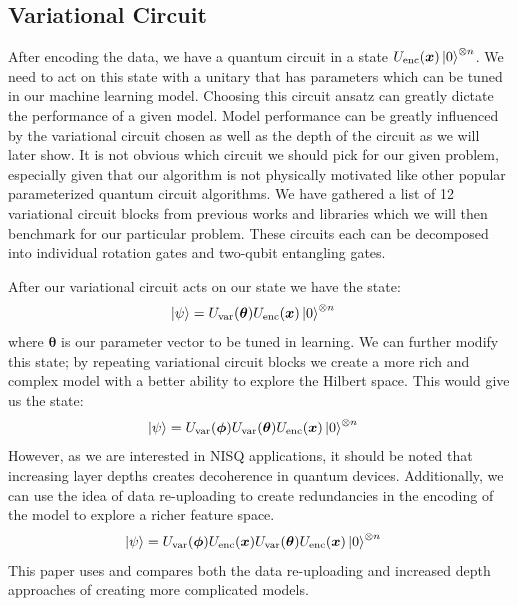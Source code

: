 \documentclass[journal=jacsat,manuscript=article]{achemso}
\begin{document}
\subsection{Variational Circuit}
After encoding the data, we have a quantum circuit in a state $U_{\text{enc}}(\bm x)\ket{0}^{\otimes n}$. We need to act on this state with a unitary that has parameters which can be tuned in our machine learning model. Choosing this circuit ansatz can greatly dictate the performance of a given model. Model performance can be greatly influenced by the variational circuit chosen as well as the depth of the circuit as we will later show. It is not obvious which circuit we should pick for our given problem, especially given that our algorithm is not physically motivated like other popular parameterized quantum circuit algorithms. We have gathered a list of 12 variational circuit blocks from previous works and libraries which we will then benchmark for our particular problem. These circuits each can be decomposed into individual rotation gates and two-qubit entangling gates. \par
After our variational circuit acts on our state we have the state:
\begin{align}
    \ket\psi &= U_{\text{var}}(\bm\theta)U_{\text{enc}}(\bm x)\ket{0}^{\otimes n} \label{eq: psi}
\end{align}
where $\bm \theta$ is our parameter vector to be tuned in learning. We can further modify this state; by repeating variational circuit blocks we create a more rich and complex model with a better ability to explore the Hilbert space. This would give us the state:
\begin{align}
    \ket\psi &= U_{\text{var}}(\bm\phi)U_{\text{var}}(\bm\theta)U_{\text{enc}}(\bm x)\ket{0}^{\otimes n} \label{eq: layers}
\end{align}
However, as we are interested in NISQ applications, it should be noted that increasing layer depths creates decoherence in quantum devices. Additionally, we can use the idea of data re-uploading to create redundancies in the encoding of the model to explore a richer feature space. 
\begin{align}
    \ket\psi &= U_{\text{var}}(\bm\phi)U_{\text{enc}}(\bm x)U_{\text{var}}(\bm\theta)U_{\text{enc}}(\bm x)\ket{0}^{\otimes n} \label{eq: re-up}
\end{align}
This paper uses and compares both the data re-uploading and increased depth approaches of creating more complicated models. 
\end{document}
